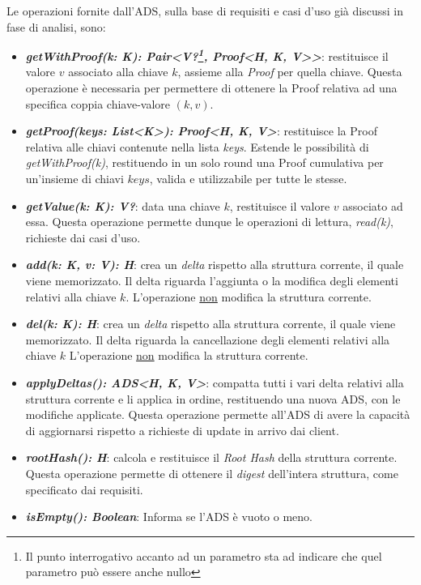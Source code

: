 		Le operazioni fornite dall'ADS, sulla base di requisiti e casi d'uso già discussi in fase di analisi, sono:
		\begin{itemize}
			\item \textbf{\textit{getWithProof(k: K): Pair<V?\footnote{Il punto interrogativo accanto ad un parametro sta ad indicare che quel parametro può essere anche nullo}, Proof<H, K, V>>}}: restituisce il valore $ v $ associato alla chiave $ k $, assieme alla \textit{Proof} per quella chiave. Questa operazione è necessaria per permettere di ottenere la Proof relativa ad una specifica coppia chiave-valore $ (k,v) $.
			\item\textbf{ \textit{getProof(keys: List<K>): Proof<H, K, V>}}: restituisce la Proof relativa alle chiavi contenute nella lista \textit{keys}. Estende le possibilità di \textit{getWithProof(k)}, restituendo in un solo round una Proof cumulativa per un'insieme di chiavi $ keys $, valida e utilizzabile per tutte le stesse. 
			\item \textbf{\textit{getValue(k: K): V?}}: data una chiave $ k $, restituisce il valore $ v $ associato ad essa. Questa operazione permette dunque le operazioni di lettura, \textit{read(k)}, richieste dai casi d'uso.
			\item \textbf{\textit{add(k: K, v: V): H}}: crea un \textit{delta} rispetto alla struttura corrente, il quale viene memorizzato. Il delta riguarda l'aggiunta o la modifica degli elementi relativi alla chiave $ k $. L'operazione \underline{non} modifica la struttura corrente.
			\item \textbf{\textit{del(k: K): H}}: crea un \textit{delta} rispetto alla struttura corrente, il quale viene memorizzato. Il delta riguarda la cancellazione degli elementi relativi alla chiave $ k $ L'operazione \underline{non} modifica la struttura corrente.
			\item \textbf{\textit{applyDeltas(): ADS<H, K, V>}}: compatta tutti i vari delta relativi alla struttura corrente e li applica in ordine, restituendo una nuova ADS, con le modifiche applicate. Questa operazione permette all'ADS di avere la capacità di aggiornarsi rispetto a richieste di update in arrivo dai client.
			\item \textbf{\textit{rootHash(): H}}: calcola e restituisce il \textit{Root Hash} della struttura corrente. Questa operazione permette di ottenere il \textit{digest} dell'intera struttura, come specificato dai requisiti.
			\item \textbf{\textit{isEmpty(): Boolean}}: Informa se l'ADS è vuoto o meno.
		\end{itemize}
	
